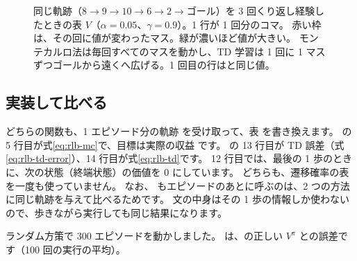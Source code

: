 \begin{figure}[tbp]
\centering
{}
\caption{同じ軌跡（$8\to9\to10\to6\to2\to$ゴール）を 3 回くり返し経験したときの表 $V$（$\alpha=0.05$、$\gamma=0.9$）。1 行が 1 回分のコマ。
赤い枠は、その回に値が変わったマス。緑が濃いほど値が大きい。
モンテカルロ法は毎回すべてのマスを動かし、TD 学習は 1 回に 1 マスずつゴールから遠くへ広げる。1 回目の行はと同じ値。}
\label{fig:rlb-mc-td-frames}
\end{figure}

\subsection*{実装して比べる}


どちらの関数も、1 エピソード分の軌跡  を受け取って、表  を書き換えます。
 の 5 行目が式\eqref{eq:rlb-mc}で、目標は実際の収益  です。
 の 13 行目が TD 誤差（式\eqref{eq:rlb-td-error}）、14 行目が式\eqref{eq:rlb-td}です。
12 行目では、最後の 1 歩のときに、次の状態（終端状態）の価値を 0 にしています。
どちらも、遷移確率の表  を一度も使っていません。
なお、 もエピソードのあとに呼ぶのは、2 つの方法に同じ軌跡を与えて比べるためです。
 文の中身はその 1 歩の情報しか使わないので、歩きながら実行しても同じ結果になります。

ランダム方策で 300 エピソードを動かしました。
は、の正しい $V^\pi$ との誤差です（100 回の実行の平均）。

